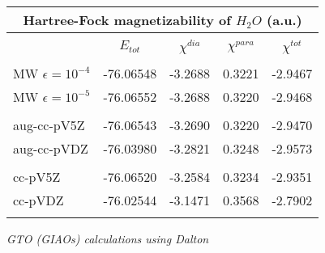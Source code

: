 \begin{frame}
\begin{table}
\centering
\begin{tabular}{l|c|ccc}
\multicolumn{5}{c}{\textbf{Hartree-Fock magnetizability of $H_2O$ (a.u.)}}\\
\hline
\hline
                    &         &             &             &            \\
                    &$E_{tot}$&$\chi^{dia}$ &$\chi^{para}$&$\chi^{tot}$\\
                    &         &             &             &            \\
MW $\epsilon=10^{-4}$  &-76.06548& -3.2688     & 0.3221      & -2.9467    \\
MW $\epsilon=10^{-5}$  &-76.06552& -3.2688     & 0.3220      & -2.9468    \\
                    &         &             &             &            \\
aug-cc-pV5Z         &-76.06543& -3.2690     & 0.3220      & -2.9470    \\
aug-cc-pVDZ         &-76.03980& -3.2821     & 0.3248      & -2.9573    \\
       	            &         &             &             &            \\
cc-pV5Z	            &-76.06520& -3.2584     & 0.3234      & -2.9351    \\
cc-pVDZ	            &-76.02544& -3.1471     & 0.3568      & -2.7902    \\
       	            &         &             &             &            \\
\hline
\hline
\end{tabular}
\end{table}

\it{GTO (GIAOs) calculations using Dalton}

\end{frame}


